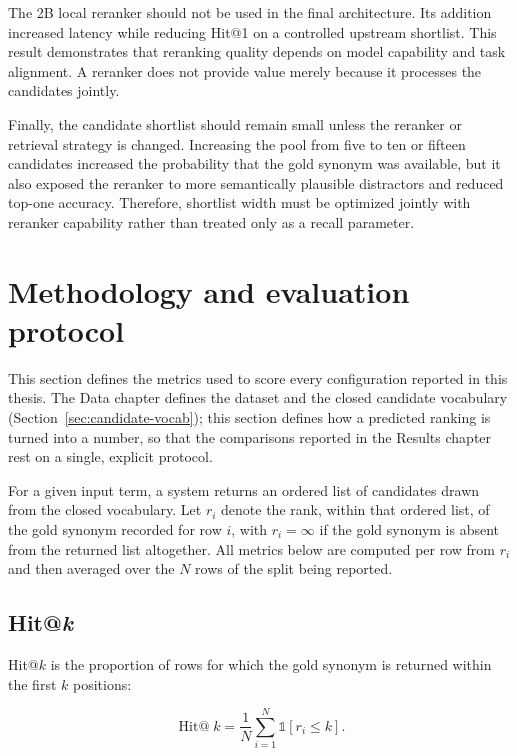 The 2B local reranker should not be used in the final architecture. Its addition increased latency while reducing Hit@1 on a controlled upstream shortlist. This result demonstrates that reranking quality depends on model capability and task alignment. A reranker does not provide value merely because it processes the candidates jointly.

Finally, the candidate shortlist should remain small unless the reranker or retrieval strategy is changed. Increasing the pool from five to ten or fifteen candidates increased the probability that the gold synonym was available, but it also exposed the reranker to more semantically plausible distractors and reduced top-one accuracy. Therefore, shortlist width must be optimized jointly with reranker capability rather than treated only as a recall parameter.

\section{Methodology and evaluation protocol}
\label{sec:methodology}

This section defines the metrics used to score every configuration reported in this thesis. The Data chapter defines the dataset and the closed candidate vocabulary (Section~\ref{sec:candidate-vocab}); this section defines how a predicted ranking is turned into a number, so that the comparisons reported in the Results chapter rest on a single, explicit protocol.

For a given input term, a system returns an ordered list of candidates drawn from the closed vocabulary. Let $r_i$ denote the rank, within that ordered list, of the gold synonym recorded for row $i$, with $r_i = \infty$ if the gold synonym is absent from the returned list altogether. All metrics below are computed per row from $r_i$ and then averaged over the $N$ rows of the split being reported.

\subsection{Hit@\textit{k}}

Hit@$k$ is the proportion of rows for which the gold synonym is returned within the first $k$ positions:

\begin{equation}
\operatorname{Hit@}k = \frac{1}{N} \sum_{i=1}^{N} \mathbb{1}\!\left[r_i \leq k\right].
\label{eq:hit-at-k}
\end{equation}

